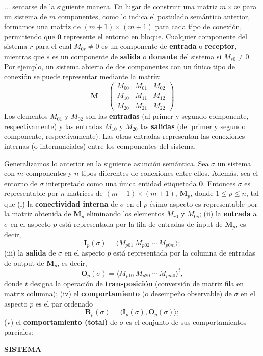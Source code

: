 {\fontsize{13}{15}\selectfont
... sentarse de la siguiente manera. En lugar de construir una matriz $m \times m$ para un sistema de $m$ componentes, como lo indica el postulado semántico anterior, formamos una matriz de $(m+1) \times (m+1)$ para cada tipo de conexión, permitiendo que $\mathbf{0}$ represente el entorno en bloque. Cualquier componente del sistema $r$ para el cual $M_{0r} \neq 0$ es un componente de \textbf{entrada} o \textbf{receptor}, mientras que $s$ es un componente de \textbf{salida} o \textbf{donante} del sistema si $M_{s0} \neq 0$. Por ejemplo, un sistema abierto de dos componentes con un único tipo de conexión se puede representar mediante la matriz:
$$ \mathbf{M} = \begin{pmatrix}
M_{00} & M_{01} & M_{02} \\
M_{10} & M_{11} & M_{12} \\
M_{20} & M_{21} & M_{22} 
\end{pmatrix} $$
Los elementos $M_{01}$ y $M_{02}$ son las \textbf{entradas} (al primer y segundo componente, respectivamente) y las entradas $M_{10}$ y $M_{20}$ las \textbf{salidas} (del primer y segundo componente, respectivamente). Las otras entradas representan las conexiones internas (o internunciales) entre los componentes del sistema.

Generalizamos lo anterior en la siguiente asunción semántica. Sea $\sigma$ un sistema con $m$ componentes y $n$ tipos diferentes de conexiones entre ellos. Además, sea el entorno de $\sigma$ interpretado como una única entidad etiquetada $\mathbf{0}$. Entonces $\sigma$ es representable por $n$ matrices de $(m+1) \times (m+1)$, $\mathbf{M}_p$, donde $1 \le p \le n$, tal que
(i) la \textbf{conectividad interna} de $\sigma$ en el $p$-ésimo aspecto es representable por la matriz obtenida de $\mathbf{M}_p$ eliminando los elementos $M_{r0}$ y $M_{0s}$;
(ii) la \textbf{entrada} a $\sigma$ en el aspecto $p$ está representada por la fila de entradas de input de $\mathbf{M}_p$, es decir,
$$ \mathbf{I}_p(\sigma) = \langle M_{p01} \ M_{p02} \ \cdots \ M_{p0m} \rangle; $$
(iii) la \textbf{salida} de $\sigma$ en el aspecto $p$ está representada por la columna de entradas de output de $\mathbf{M}_p$, es decir,
$$ \mathbf{O}_p(\sigma) = \langle M_{p10} \ M_{p20} \ \cdots \ M_{pm0} \rangle^t, $$
donde $t$ designa la operación de \textbf{transposición} (conversión de matriz fila en matriz columna);
(iv) el \textbf{comportamiento} (o desempeño observable) de $\sigma$ en el aspecto $p$ es el par ordenado
$$ \mathbf{B}_p(\sigma) = \langle \mathbf{I}_p(\sigma), \mathbf{O}_p(\sigma) \rangle; $$
(v) el \textbf{comportamiento (total)} de $\sigma$ es el conjunto de sus comportamientos parciales:
}
\newpage
\fancyhf{}
\fancyhead[r]{\thepage} 
\begin{center}
{\fontsize{16}{18}\selectfont \textbf{SISTEMA }}
\end{center}
\vspace{0.5cm}

